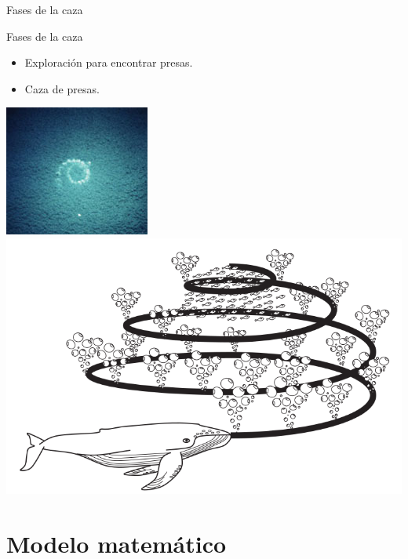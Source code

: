 \documentclass[10pt]{beamer}
\begin{document}
	\begin{frame}[fragile]{Fases de la caza}
		\vspace{10px}
		\pause
		\begin{block}{Fases de la caza}
			\begin{itemize}
				\item Exploración para encontrar presas.
				\pause
				\item Caza de presas.
			\end{itemize}
		\end{block}
		\pause
		\begin{center}
			\includegraphics[scale=0.7]{./Imagenes/imagen1.jpg}
			\hspace{10px}
			\includegraphics[scale=0.22]{./Imagenes/imagen2.png}
		\end{center}
	\end{frame}

\section{Modelo matemático}
\end{document}
